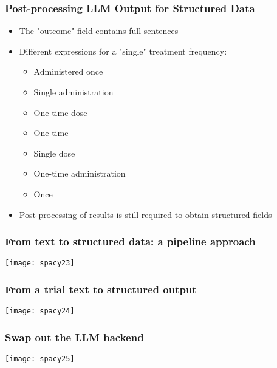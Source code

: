 \begin{frame}[fragile]\frametitle{Post-processing LLM Output for Structured Data}

\begin{itemize}
\item The "outcome" field contains full sentences
\item Different expressions for a "single" treatment frequency:
	\begin{itemize}
	\item Administered once
	\item Single administration
	\item One-time dose
	\item One time
	\item Single dose
	\item One-time administration
	\item Once
	\end{itemize}
\item Post-processing of results is still required to obtain structured fields
\end{itemize}

\end{frame}

\begin{frame}[fragile]\frametitle{From text to structured data: a pipeline approach}

\begin{center}
\texttt{[image: spacy23]}
\end{center}


\end{frame}


\begin{frame}[fragile]\frametitle{From a trial text to structured output}

\begin{center}
\texttt{[image: spacy24]}
\end{center}


\end{frame}

\begin{frame}[fragile]\frametitle{Swap out the LLM backend}

\begin{center}
\texttt{[image: spacy25]}
\end{center}


\end{frame}

